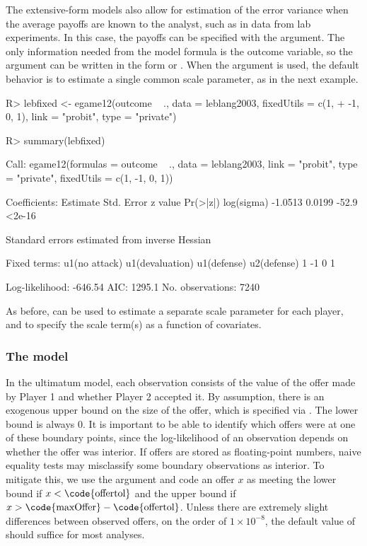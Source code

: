 \documentclass[article]{jss}
\begin{document}
The extensive-form models also allow for estimation of the error variance when
the average payoffs are known to the analyst, such as in data from lab
experiments.  In this case, the payoffs can be specified with the
 argument.  The only information needed from the model formula
is the outcome variable, so the  argument can be written in the
form  or .  When the argument  is used,
the default behavior is to estimate a single common scale parameter, as in the
next example.
\begin{Schunk}
\begin{Sinput}
R> lebfixed <- egame12(outcome ~ ., data = leblang2003, fixedUtils = c(1, 
+     -1, 0, 1), link = "probit", type = "private")
\end{Sinput}
\end{Schunk}
\begin{Schunk}
\begin{Sinput}
R> summary(lebfixed)
\end{Sinput}
\begin{Soutput}
Call:
egame12(formulas = outcome ~ ., data = leblang2003, link = "probit", 
    type = "private", fixedUtils = c(1, -1, 0, 1))

Coefficients:
           Estimate Std. Error z value Pr(>|z|)
log(sigma)  -1.0513     0.0199   -52.9   <2e-16

Standard errors estimated from inverse Hessian

Fixed terms:
  u1(no attack) u1(devaluation)     u1(defense)     u2(defense) 
              1              -1               0               1 

Log-likelihood: -646.54
AIC: 1295.1
No. observations: 7240 
\end{Soutput}
\end{Schunk}
As before,  can be used to estimate a separate scale parameter
for each player, and  to specify the scale term(s) as a
function of covariates.

\subsubsection[The ultimatum model]{The  model}

In the ultimatum model, each observation consists of the value of the offer made
by Player 1 and whether Player 2 accepted it.  By assumption, there is an
exogenous upper bound on the size of the offer, which is specified via
.  The lower bound is always 0.  It is important to be able to
identify which offers were at one of these boundary points, since the
log-likelihood of an observation depends on whether the offer was interior.  If
offers are stored as floating-point numbers, naive equality tests may
misclassify some boundary observations as interior.  To mitigate this, we use
the argument  and code an offer $x$ as meeting the lower bound if
$x < \mbox{\code{offertol}}$ and the upper bound if $x > \mbox{\code{maxOffer}}
- \mbox{\code{offertol}}$.  Unless there are extremely slight differences
between observed offers, on the order of $1 \times 10^{-8}$, the default value
of  should suffice for most analyses.
\end{document}

